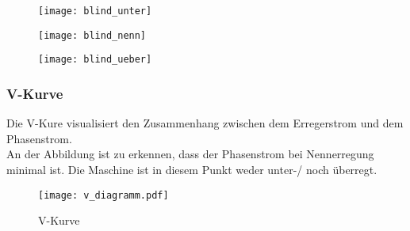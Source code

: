 \begin{flushleft}
\begin{figure}[H]
\begin{minipage}[t]{0.3\textwidth}
\centering
\texttt{[image: blind\_unter]}
\end{minipage}
\begin{minipage}[t]{0.3\textwidth}
\centering
\texttt{[image: blind\_nenn]}
\end{minipage}
\begin{minipage}[t]{0.3\textwidth}
\centering
\texttt{[image: blind\_ueber]}
\end{minipage}
\end{figure}
\newpage

\subsubsection{V-Kurve}

Die V-Kure visualisiert den Zusammenhang zwischen dem Erregerstrom und dem Phasenstrom.\\
An der Abbildung ist zu erkennen, dass der Phasenstrom bei Nennerregung minimal ist. Die Maschine ist in diesem Punkt weder unter-/ noch überregt.


\begin{figure}[H]
    \centering
        \texttt{[image: v\_diagramm.pdf]}
    \caption{V-Kurve}
\end{figure}





\end{flushleft}